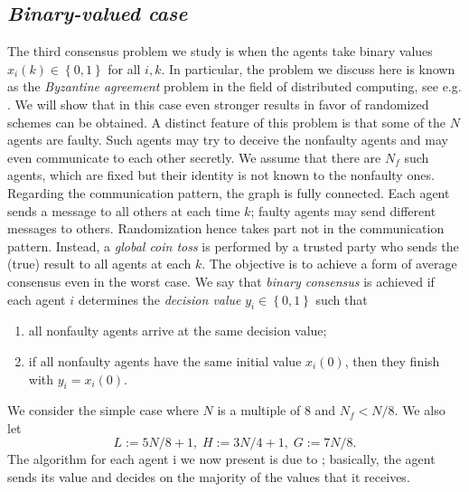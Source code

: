 \documentclass[12pt]{article}
\begin{document}
			\subsection{\textit{Binary-valued case}}
			The third consensus problem we study is when the agents take binary values $x_{i}(k) 
			\in \left\{ 0,1 \right\}$ for all $i, k$. In particular, the problem we discuss here is known as the 
			\textit{Byzantine 	agreement} problem in the field of distributed computing, see e.g. \cite{bib17}. We will show that in this case even stronger results in favor of randomized schemes can be obtained.  A distinct feature of this problem is that some of the $N$ agents are faulty. Such agents may try to deceive the nonfaulty agents and may even communicate to each other secretly. We assume that there are $N_{f}$ such agents, which are fixed but their identity is not known to the nonfaulty ones. Regarding the communication pattern, the graph is fully connected. Each agent sends a message to all others at each time $k$; faulty agents may send different messages to others. Randomization hence takes part not in the communication pattern. Instead, a \textit{global coin toss} is performed by a trusted party who sends the (true) result to all agents at each $k$.  The objective is to achieve a form of average consensus even in the worst case. We say that \textit{binary consensus} is achieved if each agent $i$ determines the \textit{decision value} $y_{i} \in \left\{ 0,1 \right\}$ such that 
			\begin{enumerate}[label=(\roman*)] 	
				\item all nonfaulty agents arrive at the same decision value; 	 	
				\item if all nonfaulty agents have the same initial value 	$x_{i}(0)$, then they finish with $y_{i} = x_{i}(0)$. 
			\end{enumerate}  
				We consider the simple case where $N$ is a multiple of $8$ and $N_{f} < N/8$. We also let 
			\begin{equation*} 	
				L:=5N/8+1,\; H:=3N/4+1,\; G:=7N/8. 
			\end{equation*}  
			The algorithm for each agent i we now present is due to \cite{bib19}; basically, the agent sends its value and decides on the majority of the values that it receives. 
\end{document}
